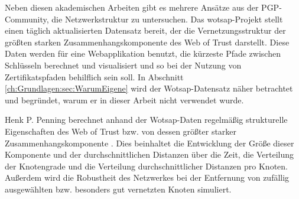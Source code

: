 Neben diesen akademischen Arbeiten gibt es mehrere Ansätze aus der
PGP-Community, die Netzwerkstruktur zu untersuchen. Das
wotsap-Projekt\cite{Cederlof} stellt einen täglich aktualisierten
Datensatz bereit, der die Vernetzungsstruktur der größten starken
Zusammenhangskomponente des Web of Trust darstellt. Diese Daten werden
für eine Webapplikation benutzt, die kürzeste Pfade
zwischen Schlüsseln berechnet und visualisiert und so bei der
Nutzung von Zertifikatspfaden behilflich sein soll. In Abschnitt
\ref{ch:Grundlagen:sec:WarumEigene} wird der Wotsap-Datensatz näher
betrachtet und begründet, warum er in dieser Arbeit nicht verwendet
wurde. 

Henk P. Penning berechnet anhand der Wotsap-Daten regelmäßig
strukturelle Eigenschaften des Web of Trust bzw. von dessen größter
starker Zusammenhangskomponente \cite{Penning}. Dies beinhaltet die
Entwicklung der Größe dieser Komponente und der durchschnittlichen
Distanzen über die Zeit, die Verteilung der Knotengrade und die
Verteilung durchschnittlicher Distanzen pro Knoten. Außerdem wird die
Robustheit des Netzwerkes bei der Entfernung von zufällig
ausgewählten bzw. besonders gut vernetzten Knoten simuliert.

